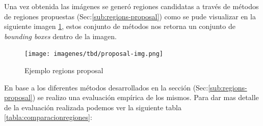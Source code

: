 
Una vez obtenida las imágenes se generó regiones candidatas a través de métodos de regiones propuestas (Sec:\ref{sub:regions-proposal}) como se pude visualizar en la siguiente imagen \ref{Fig:rp-ejemplo}, estos conjunto de métodos nos retorna  un conjunto de \textit{bounding boxes} dentro de la imagen.

\begin{figure}[H] \centering
  \texttt{[image: imagenes/tbd/proposal-img.png]}
  \caption{Ejemplo regions proposal}\label{Fig:rp-ejemplo}
\end{figure}

En base a los diferentes métodos desarrollados en la sección (Sec:\ref{sub:regions-proposal}) se realizo una evaluación empírica de los mismos. Para dar mas detalle de la evaluación realizada podemos ver la siguiente tabla \ref{tabla:comparacionregiones}:

